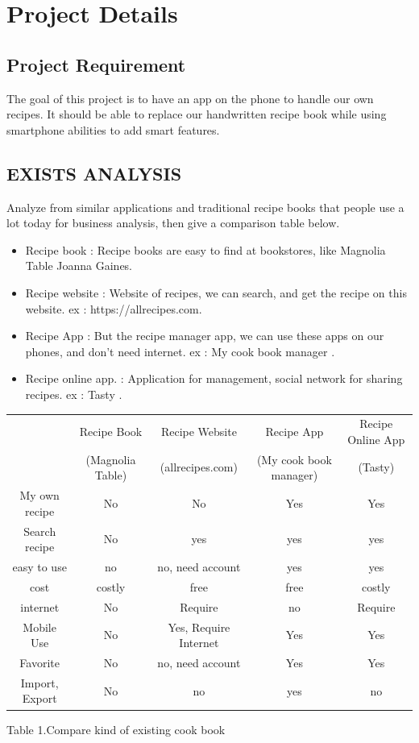 \documentclass{article}
\begin{document}
\section{Project Details }
\subsection{Project Requirement}
\qquad The goal of this project is to have an app on the phone to handle our own recipes. It should be able to replace our handwritten recipe book while using smartphone abilities to add smart features.
\subsection{EXISTS ANALYSIS}
\qquad Analyze from similar applications and traditional recipe books that people use a lot today for business analysis, then give a comparison table below.
\begin{itemize}
\item Recipe book : Recipe books are easy to find at bookstores, like Magnolia Table Joanna Gaines.
\item Recipe website : Website of recipes, we can search, and get the recipe on this website. ex : https://allrecipes.com.
\item Recipe App : But the recipe manager app, we can use these apps on our phones, and don't need internet. ex : My cook book manager .
\item Recipe online app. : Application for management, social network for sharing recipes. ex : Tasty .
\end{itemize}
\begin{center}
 \begin{tabular}{||c c c c c||} 
 \hline
  & Recipe Book & Recipe Website & Recipe App & Recipe Online App \\ [0.5ex] 
  & (Magnolia Table) & (allrecipes.com) & (My cook book manager) & (Tasty) \\ [0.5ex] 
 \hline\hline
My own recipe & No & No & Yes & Yes \\ 
 \hline
 Search recipe & No & yes & yes & yes \\
 \hline
 easy to use & no & no, need account & yes & yes \\
 \hline
 cost & costly & free & free &  costly\\
 \hline
 internet & No & Require & no & Require \\ [1ex] 
 \hline
 Mobile Use & No & Yes, Require Internet & Yes & Yes \\ [1ex] 
  \hline
 Favorite & No & no, need account & Yes & Yes \\ [1ex] 
 \hline
  Import, Export & No & no & yes & no \\ [1ex] 
 \hline
\end{tabular}
\caption{Table 1.Compare kind of existing cook book}
\end{center}
\newpage
\end{document}
